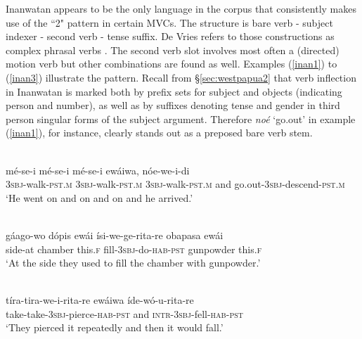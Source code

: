 Inanwatan appears to be the only language in the corpus that consistently makes use of the ``2" pattern in certain MVCs. The structure is bare verb - subject indexer - second verb - tense suffix. De Vries refers to those constructions as complex phrasal verbs \citep[57]{devries2004}. The second verb slot involves most often a (directed) motion verb but other combinations are found as well. Examples (\ref{inan1}) to (\ref{inan3}) illustrate the pattern. Recall from §\ref{sec:westpapua2} that verb inflection in Inanwatan is marked both by prefix sets for subject and objects (indicating person and number), as well as by suffixes denoting tense and gender in third person singular forms of the subject argument. Therefore \textit{noé} `go.out' in example (\ref{inan1}), for instance, clearly stands out as a preposed bare verb stem.

\ea \label{inan1}
\\
\gll mé-se-i mé-se-i mé-se-i ewáiwa, nóe-we-i-di \\
3\textsc{sbj}-walk-\textsc{pst}.\textsc{m} 3\textsc{sbj}-walk-\textsc{pst}.\textsc{m} 3\textsc{sbj}-walk-\textsc{pst}.\textsc{m} and go.out-3\textsc{sbj}-descend-\textsc{pst}.\textsc{m} \\
\glft `He went on and on and on and he arrived.' \\ 
\z

\ea \label{inan2}
\\
\gll gáago-wo dópis ewái ísi-we-ge-rita-re obapasa ewái \\
side-at chamber this.\textsc{f} fill-3\textsc{sbj}-do-\textsc{hab}-\textsc{pst} gunpowder this.\textsc{f} \\
\glft `At the side they used to fill the chamber with gunpowder.'\\ 
\z

\ea \label{inan3}
\\
\gll tíra-tira-we-i-rita-re ewáiwa íde-wó-u-rita-re \\
take-take-3\textsc{sbj}-pierce-\textsc{hab}-\textsc{pst} and \textsc{intr}-3\textsc{sbj}-fell-\textsc{hab}-\textsc{pst} \\
\glft `They pierced it repeatedly and then it would fall.'\\ 
\z

